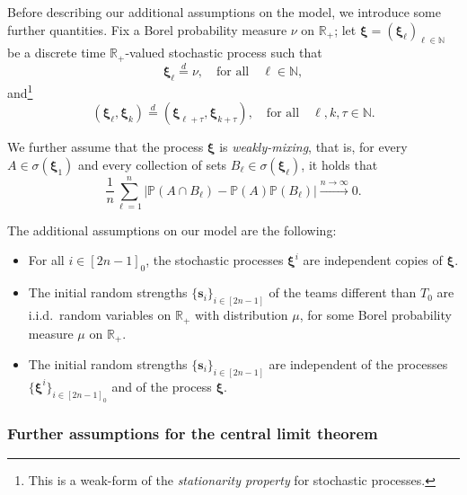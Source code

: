 \documentclass[11pt,a4paper,oneside]{article}
\theoremstyle{definition}
\theoremstyle{remark}
\def\N{\mathbb{N}}
\def\P{\mathbb{P}}
\def\R{\mathbb{R}}
\begin{document}
Before describing our additional assumptions on the model, we introduce some further quantities.
Fix a Borel probability measure $\nu$ on $\R_+$; let $\bm \xi=(\bm \xi_\ell)_{\ell\in \N}$ be a discrete time $\R_+$-valued stochastic process such that 
\begin{equation}\label{eq:stationarity0}
	\bm \xi_\ell\stackrel{d}{=}\nu,\quad\text{for all}\quad \ell\in \N,
\end{equation}  
and\footnote{This is a weak-form of the \emph{stationarity property} for stochastic processes.}
\begin{equation}\label{eq:stationarity}
\left(\bm \xi_\ell,\bm \xi_k\right)\stackrel{d}{=} \left(\bm \xi_{\ell+\tau},\bm \xi_{k+\tau}\right), \quad\text{for all}\quad \ell,k,\tau\in\N.
\end{equation}


We further assume that the process $\bm \xi$ is \emph{weakly-mixing}, that is, for every $A \in \sigma(\bm \xi_1)$ and every collection of sets $B_\ell \in \sigma(\bm \xi_\ell)$, it holds that
\begin{equation}\label{eq:unif_weak_mix1}
\frac{1}{n} \sum_{\ell=1}^n \left|\P(A \cap B_\ell)-\P(A)\P(B_\ell)\right|\xrightarrow{n\to\infty} 0.
\end{equation}

The additional assumptions on our model are the following:

\begin{itemize}
\item For all $i\in[2n-1]_0$, the stochastic processes $\bm \xi^i$  are independent copies of $\bm \xi$.
\item The initial random strengths $\{\bm s_i\}_{i\in[2n-1]}$ of the teams different than $T_0$ are i.i.d.\ random variables on $\R_+$ with distribution $\mu$, for some Borel probability measure $\mu$ on $\R_+$.
\item The initial random strengths $\{\bm s_i\}_{i\in[2n-1]}$ are independent of the processes $\{\bm \xi^i\}_{i\in[2n-1]_0}$ and of the process  $\bm \xi$.
\end{itemize}





\subsubsection{Further assumptions for the central limit theorem}\label{ass:CLT}
\end{document}
